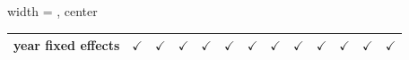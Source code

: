 \begin{table}[htbp]
\begin{adjustbox}{width = \textwidth, center}
\begin{tabular}{lcccccccccccc}
         year fixed effects                                 & $\checkmark$           & $\checkmark$  & $\checkmark$  & $\checkmark$           & $\checkmark$  & $\checkmark$  & $\checkmark$    & $\checkmark$   & $\checkmark$  & $\checkmark$  & $\checkmark$  & $\checkmark$\\   
         \bottomrule
      \end{tabular}
   \end{adjustbox}
\end{table}


